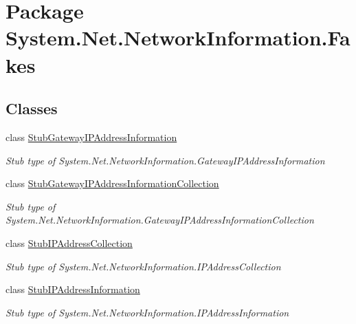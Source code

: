 \hypertarget{namespace_system_1_1_net_1_1_network_information_1_1_fakes}{\section{Package System.\-Net.\-Network\-Information.\-Fakes}
\label{namespace_system_1_1_net_1_1_network_information_1_1_fakes}
}
\subsection*{Classes}
\begin{DoxyCompactItemize}
\item 
class \hyperlink{class_system_1_1_net_1_1_network_information_1_1_fakes_1_1_stub_gateway_i_p_address_information}{Stub\-Gateway\-I\-P\-Address\-Information}
\begin{DoxyCompactList}\small\item\em Stub type of System.\-Net.\-Network\-Information.\-Gateway\-I\-P\-Address\-Information\end{DoxyCompactList}\item 
class \hyperlink{class_system_1_1_net_1_1_network_information_1_1_fakes_1_1_stub_gateway_i_p_address_information_collection}{Stub\-Gateway\-I\-P\-Address\-Information\-Collection}
\begin{DoxyCompactList}\small\item\em Stub type of System.\-Net.\-Network\-Information.\-Gateway\-I\-P\-Address\-Information\-Collection\end{DoxyCompactList}\item 
class \hyperlink{class_system_1_1_net_1_1_network_information_1_1_fakes_1_1_stub_i_p_address_collection}{Stub\-I\-P\-Address\-Collection}
\begin{DoxyCompactList}\small\item\em Stub type of System.\-Net.\-Network\-Information.\-I\-P\-Address\-Collection\end{DoxyCompactList}\item 
class \hyperlink{class_system_1_1_net_1_1_network_information_1_1_fakes_1_1_stub_i_p_address_information}{Stub\-I\-P\-Address\-Information}
\begin{DoxyCompactList}\small\item\em Stub type of System.\-Net.\-Network\-Information.\-I\-P\-Address\-Information\end{DoxyCompactList}\item 

\end{DoxyCompactItemize}
